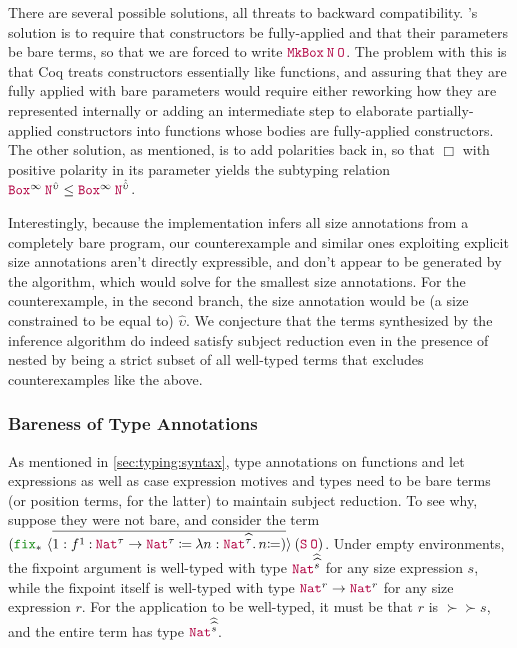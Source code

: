 There are several possible solutions, all threats to backward compatibility.
\CIChat's solution is to require that constructors be fully-applied and that their parameters be bare terms,
so that we are forced to write $\app{\MkBox}{\nat}{\Zero}$.
The problem with this is that Coq treats constructors essentially like functions,
and assuring that they are fully applied with bare parameters would require either reworking how they are represented internally
or adding an intermediate step to elaborate partially-applied constructors into functions whose bodies are fully-applied constructors.
The other solution, as mentioned, is to add polarities back in, so that $\Box$ with positive polarity in its parameter yields the subtyping relation $\app{\Box^\infty}{\nat^{\hat{\upsilon}}} \leq \app{\Box^\infty}{\nat^{\hat{\hat{\upsilon}}}}$.

Interestingly, because the implementation infers all size annotations from a completely bare program,
our counterexample and similar ones exploiting explicit size annotations aren't directly expressible,
and don't appear to be generated by the algorithm, which would solve for the smallest size annotations.
For the counterexample, in the second branch, the size annotation would be (a size constrained to be equal to) $\hat{\upsilon}$.
We conjecture that the terms synthesized by the inference algorithm do indeed satisfy subject reduction even in the presence of nested \coinductives
by being a strict subset of all well-typed terms that excludes counterexamples like the above.

\subsubsection{Bareness of Type Annotations}\label{sec:metatheory:sr:bare}

As mentioned in \autoref{sec:typing:syntax}, type annotations on functions and let expressions
as well as case expression motives and \cofixpoint types
need to be bare terms (or position terms, for the latter) to maintain subject reduction.
To see why, suppose they were not bare, and consider the term
$\app{(\fix*{1}{\defn{f^1}{\Nat^\tau \rightarrow \Nat^\tau}{\abs{n}{\Nat^{\succ{\tau}}}{n}}})}{(\app{\Succ}{\Zero})}$.
Under empty environments, the fixpoint argument is well-typed with type $\Nat^{\succ{\succ{s}}}$ for any size expression $s$,
while the fixpoint itself is well-typed with type $\Nat^{r} \rightarrow \Nat^{r}$ for any size expression $r$.
For the application to be well-typed, it must be that $r$ is $\succ{\succ{s}}$,
and the entire term has type $\Nat^{\succ{\succ{s}}}$.

